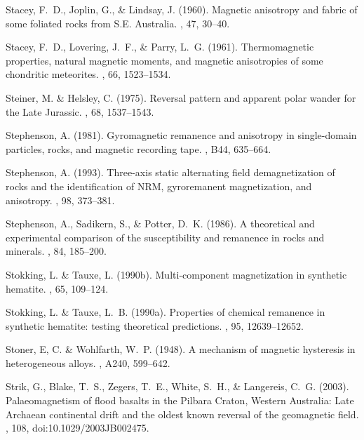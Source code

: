 \documentclass[11pt]{book}
\begin{document}
\begin{thebibliography}{}
Stacey, F.~D., Joplin, G., \& Lindsay, J. (1960).
\newblock Magnetic anisotropy and fabric of some foliated rocks from S.E.
  Australia.
, 47, 30--40.

Stacey, F.~D., Lovering, J.~F., \& Parry, L.~G. (1961).
\newblock Thermomagnetic properties, natural magnetic moments, and magnetic
  anisotropies of some chondritic meteorites.
, 66, 1523--1534.

Steiner, M. \& Helsley, C. (1975).
\newblock Reversal pattern and apparent polar wander for the Late Jurassic.
, 68, 1537--1543.

Stephenson, A. (1981).
\newblock Gyromagnetic remanence and anisotropy in single-domain particles,
  rocks, and magnetic recording tape.
, B44, 635--664.

Stephenson, A. (1993).
\newblock Three-axis static alternating field demagnetization of rocks and the
  identification of NRM, gyroremanent magnetization, and anisotropy.
, 98, 373--381.

Stephenson, A., Sadikern, S., \& Potter, D.~K. (1986).
\newblock A theoretical and experimental comparison of the susceptibility and
  remanence in rocks and minerals.
, 84, 185--200.

Stokking, L. \& Tauxe, L. (1990b).
\newblock Multi-component magnetization in synthetic hematite.
, 65, 109--124.

Stokking, L. \& Tauxe, L.~B. (1990a).
\newblock Properties of chemical remanence in synthetic hematite: testing
  theoretical predictions.
, 95, 12639--12652.

Stoner, E, C. \& Wohlfarth, W.~P. (1948).
\newblock A mechanism of magnetic hysteresis in heterogeneous alloys.
, A240, 599--642.

Strik, G., Blake, T.~S., Zegers, T.~E., White, S.~H., \& Langereis, C.~G.
  (2003).
\newblock Palaeomagnetism of flood basalts in the Pilbara Craton, Western
  Australia: Late Archaean continental drift and the oldest known reversal of
  the geomagnetic field.
, 108, doi:10.1029/2003JB002475.


\end{thebibliography}
\end{document}
